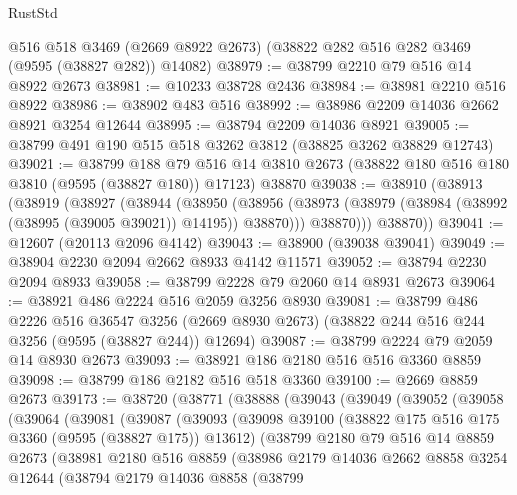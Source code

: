 \begin{lexlean}{RustStd}
\begin{coremodule}
    @516
    @518
    @3469
    (@2669 @8922 @2673)
    (@38822 @282 @516 @282 @3469 (@9595 (@38827 @282)) @14082)
@38979 := @38799 @2210 @79 @516 @14 @8922 @2673
@38981 := @10233 @38728 @2436
@38984 := @38981 @2210 @516 @8922
@38986 := @38902 @483 @516
@38992 := @38986 @2209 @14036 @2662 @8921 @3254 @12644
@38995 := @38794 @2209 @14036 @8921
@39005 := @38799 @491 @190 @515 @518 @3262 @3812 (@38825 @3262 @38829 @12743)
@39021 := @38799
    @188
    @79
    @516
    @14
    @3810
    @2673
    (@38822 @180 @516 @180 @3810 (@9595 (@38827 @180)) @17123)
    @38870
@39038 := @38910
    (@38913
      (@38919
        (@38927
          (@38944
            (@38950
              (@38956 (@38973 (@38979 (@38984 (@38992 (@38995 (@39005 @39021)) @14195)) @38870)))
              @38870)))
        @38870))
@39041 := @12607 (@20113 @2096 @4142)
@39043 := @38900 (@39038 @39041)
@39049 := @38904 @2230 @2094 @2662 @8933 @4142 @11571
@39052 := @38794 @2230 @2094 @8933
@39058 := @38799 @2228 @79 @2060 @14 @8931 @2673
@39064 := @38921 @486 @2224 @516 @2059 @3256 @8930
@39081 := @38799
    @486
    @2226
    @516
    @36547
    @3256
    (@2669 @8930 @2673)
    (@38822 @244 @516 @244 @3256 (@9595 (@38827 @244)) @12694)
@39087 := @38799 @2224 @79 @2059 @14 @8930 @2673
@39093 := @38921 @186 @2180 @516 @516 @3360 @8859
@39098 := @38799 @186 @2182 @516 @518 @3360
@39100 := @2669 @8859 @2673
@39173 := @38720
    (@38771
      (@38888
        (@39043
          (@39049
            (@39052
              (@39058
                (@39064
                  (@39081
                    (@39087
                      (@39093
                        (@39098
                          @39100
                          (@38822 @175 @516 @175 @3360 (@9595 (@38827 @175)) @13612)
                          (@38799
                            @2180
                            @79
                            @516
                            @14
                            @8859
                            @2673
                            (@38981
                              @2180
                              @516
                              @8859
                              (@38986
                                @2179
                                @14036
                                @2662
                                @8858
                                @3254
                                @12644
                                (@38794
                                  @2179
                                  @14036
                                  @8858
                                  (@38799

\end{coremodule}
\end{lexlean}
